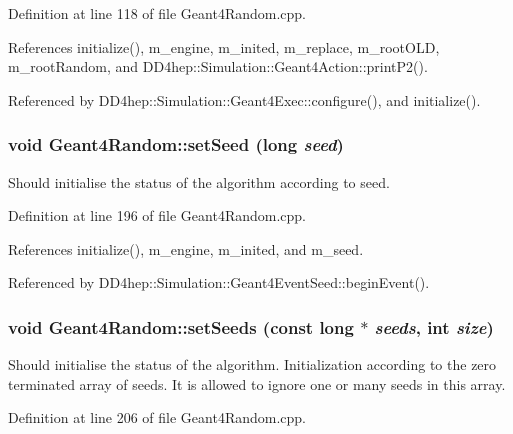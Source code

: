 Definition at line 118 of file Geant4Random.cpp.

References initialize(), m\_\-engine, m\_\-inited, m\_\-replace, m\_\-rootOLD, m\_\-rootRandom, and DD4hep::Simulation::Geant4Action::printP2().

Referenced by DD4hep::Simulation::Geant4Exec::configure(), and initialize().\hypertarget{class_d_d4hep_1_1_simulation_1_1_geant4_random_a67c43b5a941c94c3bbf7d134274bbde8}{
\subsubsection[{setSeed}]{\setlength{\rightskip}{0pt plus 5cm}void Geant4Random::setSeed (long {\em seed})}}
\label{class_d_d4hep_1_1_simulation_1_1_geant4_random_a67c43b5a941c94c3bbf7d134274bbde8}


Should initialise the status of the algorithm according to seed. 

Definition at line 196 of file Geant4Random.cpp.

References initialize(), m\_\-engine, m\_\-inited, and m\_\-seed.

Referenced by DD4hep::Simulation::Geant4EventSeed::beginEvent().\hypertarget{class_d_d4hep_1_1_simulation_1_1_geant4_random_af110cf82c38501f6a437f3b0b7fc9bf4}{
\subsubsection[{setSeeds}]{\setlength{\rightskip}{0pt plus 5cm}void Geant4Random::setSeeds (const long $\ast$ {\em seeds}, \/  int {\em size})}}
\label{class_d_d4hep_1_1_simulation_1_1_geant4_random_af110cf82c38501f6a437f3b0b7fc9bf4}


Should initialise the status of the algorithm. Initialization according to the zero terminated array of seeds. It is allowed to ignore one or many seeds in this array. 

Definition at line 206 of file Geant4Random.cpp.

